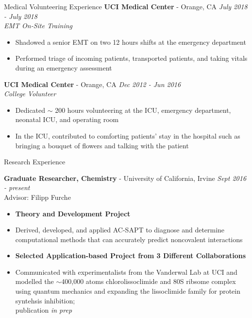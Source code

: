 \documentclass{resume} %
\begin{document}
\begin{rSection}{Medical Volunteering Experience}
  {\bf UCI Medical Center} - Orange, CA \hfill {\em July 2018 - July 2018}  \\
  {\textit{EMT On-Site Training}}
  \vspace{-0.5em}
  \begin{itemize}
    \itemsep-0.75em
  \item Shadowed a senior EMT on two 12 hours shifts at the emergency department
  \item Performed triage of incoming patients, transported patients, and taking
    vitals during an emergency assessment
  \end{itemize}
  
  {\bf UCI Medical Center} - Orange, CA \hfill {\em Dec 2012 - Jun 2016}  \\
  {\textit{College Volunteer}}
  \vspace{-0.5em}
  \begin{itemize}
    \itemsep-0.75em
  \item Dedicated $\sim$ 200 hours volunteering at the ICU, emergency department, neonatal
    ICU, and operating room
  \item In the ICU, contributed to comforting patients' stay in the hospital
    such as bringing a bouquet of flowers and talking with the patient
  \end{itemize}
\end{rSection}

\begin{rSection}{Research Experience}

\textbf{Graduate Researcher, Chemistry} - University of California, Irvine \hfill {\em Sept 2016 - present}\\
Advisor: Filipp Furche
\vspace{-0.5em}
\begin{itemize}    
\itemsep-0.65em
\item[] \textbf{Theory and Development Project}
\item Derived, developed, and applied AC-SAPT to diagnose and determine computational methods that
  can accurately predict noncovalent interactions
\item[] \textbf{Selected Application-based Project from 3 Different Collaborations}
\item Communicated with experimentalists from the Vanderwal Lab at UCI and modelled
  the $\sim$400,000 atoms chlorolissoclimide and 80S ribsome complex
  using quantum mechanics and expanding the lissoclimide family for protein syntehsis inhibition; \\
  publication \textit{in prep}
\end{itemize}

\end{rSection}
\end{document}
